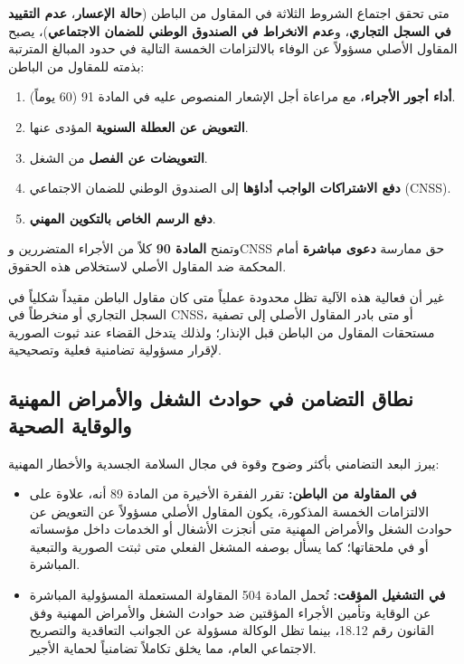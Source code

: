 \begin{tcolorbox}[colback=red!5, colframe=accentcolor, arc=4pt,
    title={\textbf{نطاق المسؤولية المشتركة والضمانات في المادتين \textenglish{89} و\textenglish{90}}}]
متى تحقق اجتماع الشروط الثلاثة في المقاول من الباطن (\textbf{حالة الإعسار}، \textbf{عدم التقييد في السجل التجاري}، و\textbf{عدم الانخراط في الصندوق الوطني للضمان الاجتماعي})، يصبح المقاول الأصلي مسؤولاً عن الوفاء بالالتزامات الخمسة التالية في حدود المبالغ المترتبة بذمته للمقاول من الباطن:
\begin{enumerate}[leftmargin=*, itemsep=4pt]
    \item \textbf{أداء أجور الأجراء}، مع مراعاة أجل الإشعار المنصوص عليه في المادة \textenglish{91} (\textenglish{60} يوماً).
    \item \textbf{التعويض عن العطلة السنوية} المؤدى عنها.
    \item \textbf{التعويضات عن الفصل} من الشغل.
    \item \textbf{دفع الاشتراكات الواجب أداؤها} إلى الصندوق الوطني للضمان الاجتماعي (\textenglish{CNSS}).
    \item \textbf{دفع الرسم الخاص بالتكوين المهني}.
\end{enumerate}
وتمنح \textbf{المادة \textenglish{90}} كلاً من الأجراء المتضررين و\textenglish{CNSS} حق ممارسة \textbf{دعوى مباشرة} أمام المحكمة ضد المقاول الأصلي لاستخلاص هذه الحقوق.
\end{tcolorbox}

غير أن فعالية هذه الآلية تظل محدودة عملياً متى كان مقاول الباطن مقيداً شكلياً في السجل التجاري أو منخرطاً في \textenglish{CNSS}، أو متى بادر المقاول الأصلي إلى تصفية مستحقات المقاول من الباطن قبل الإنذار؛ ولذلك يتدخل القضاء عند ثبوت الصورية لإقرار مسؤولية تضامنية فعلية وتصحيحية.

\subsection{نطاق التضامن في حوادث الشغل والأمراض المهنية والوقاية الصحية}
يبرز البعد التضامني بأكثر وضوح وقوة في مجال السلامة الجسدية والأخطار المهنية:
\begin{itemize}[leftmargin=*, itemsep=5pt]
    \item \textbf{في المقاولة من الباطن:} تقرر الفقرة الأخيرة من المادة \textenglish{89} أنه، علاوة على الالتزامات الخمسة المذكورة، يكون المقاول الأصلي مسؤولاً عن التعويض عن حوادث الشغل والأمراض المهنية متى أنجزت الأشغال أو الخدمات داخل مؤسساته أو في ملحقاتها؛ كما يسأل بوصفه المشغل الفعلي متى ثبتت الصورية والتبعية المباشرة.
    \item \textbf{في التشغيل المؤقت:} تُحمل المادة \textenglish{504} المقاولة المستعملة المسؤولية المباشرة عن الوقاية وتأمين الأجراء المؤقتين ضد حوادث الشغل والأمراض المهنية وفق القانون رقم \textenglish{18.12}، بينما تظل الوكالة مسؤولة عن الجوانب التعاقدية والتصريح الاجتماعي العام، مما يخلق تكاملاً تضامنياً لحماية الأجير.
\end{itemize}

